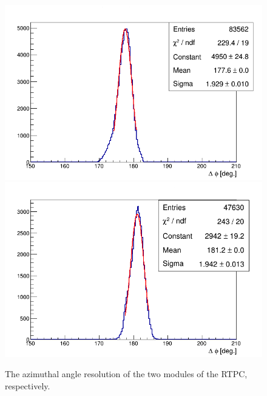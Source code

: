 \begin{figure}[tbp]
\includegraphics[scale=0.31]{fig_rtpc/fit_delta_phi_l.png}
\includegraphics[scale=0.31]{fig_rtpc/fit_delta_phi_r.png}
\caption{The azimuthal angle resolution of the two modules of the RTPC, 
respectively.}
\label{fig:rtpc_resolution_phi}
\end{figure}

